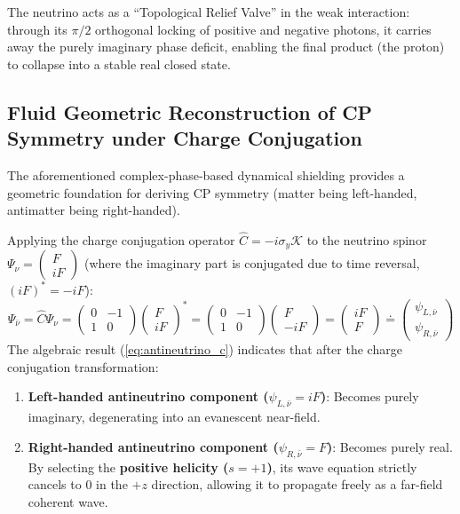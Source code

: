 \documentclass[12pt, a4paper]{article}
\begin{document}
The neutrino acts as a ``Topological Relief Valve'' in the weak interaction: through its $\pi/2$ orthogonal locking of positive and negative photons, it carries away the purely imaginary phase deficit, enabling the final product (the proton) to collapse into a stable real closed state.

\subsection{Fluid Geometric Reconstruction of CP Symmetry under Charge Conjugation}

The aforementioned complex-phase-based dynamical shielding provides a geometric foundation for deriving CP symmetry (matter being left-handed, antimatter being right-handed).

Applying the charge conjugation operator $\hat{C} = -i\sigma_y \mathcal{K}$ to the neutrino spinor $\Psi_\nu = \begin{pmatrix} F \\ iF \end{pmatrix}$ (where the imaginary part is conjugated due to time reversal, $(iF)^* = -iF$):
\begin{equation}
\Psi_{\bar{\nu}} = \hat{C} \Psi_\nu = \begin{pmatrix} 0 & -1 \\ 1 & 0 \end{pmatrix} \begin{pmatrix} F \\ iF \end{pmatrix}^* = \begin{pmatrix} 0 & -1 \\ 1 & 0 \end{pmatrix} \begin{pmatrix} F \\ -iF \end{pmatrix} = \begin{pmatrix} iF \\ F \end{pmatrix} \doteq \begin{pmatrix} \psi_{L, \bar{\nu}} \\ \psi_{R, \bar{\nu}} \end{pmatrix} \label{eq:antineutrino_c}
\end{equation}
The algebraic result (\ref{eq:antineutrino_c}) indicates that after the charge conjugation transformation:
\begin{enumerate}
    \item \textbf{Left-handed antineutrino component ($\psi_{L,\bar{\nu}} = iF$)}: Becomes purely imaginary, degenerating into an evanescent near-field.
    
    \item \textbf{Right-handed antineutrino component ($\psi_{R,\bar{\nu}} = F$)}: Becomes purely real. By selecting the \textbf{positive helicity ($s = +1$)}, its wave equation strictly cancels to $0$ in the $+z$ direction, allowing it to propagate freely as a far-field coherent wave.
\end{enumerate}
\end{document}
